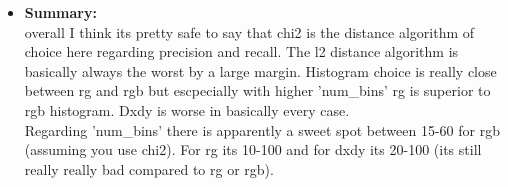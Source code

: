 \documentclass[12pt]{article}
\begin{document}
\begin{enumerate}[a)]
\begin{itemize}
            \item
                \textbf{Summary:}\\
                overall I think its pretty safe to say that chi2 is the distance algorithm of choice here regarding precision and recall. The l2 distance algorithm is basically always the worst by a large margin. Histogram choice is really close between rg and rgb but escpecially with higher 'num\_bins' rg is superior to rgb histogram. Dxdy is worse in basically every case.\\
                Regarding 'num\_bins' there is apparently a sweet spot between 15-60 for rgb (assuming you use chi2). For rg its 10-100 and for dxdy its 20-100 (its still really really bad compared to rg or rgb).
        \end{itemize}
\end{enumerate}
\end{document}
